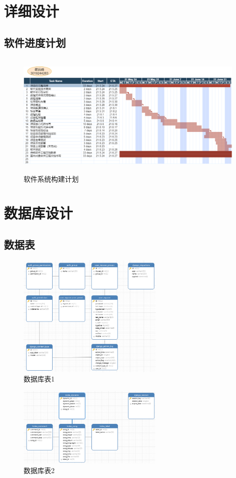 \documentclass[UTF8,14pt]{article}
\numberwithin{figure}{subsubsection}
\numberwithin{table}{subsubsection}
\begin{document}
\section{详细设计}
\subsection{软件进度计划}
\begin{figure}[H]
	\centering
	\includegraphics[width=13.06cm,height=6.12cm]{software.png}
	\caption{软件系统构建计划}
\end{figure}

\clearpage
\section{数据库设计}
\subsection{数据表}
\begin{minipage}[t]{0.58\linewidth}
	\begin{figure}[H]
		\includegraphics[width=7.12cm,height=6.01cm]{ER1.png}
		\caption{数据库表1}
	\end{figure}
\end{minipage}
\begin{minipage}[t]{0.4\linewidth}
	\begin{figure}[H]
		\centering
		\includegraphics[width=7.10cm,height=3.90cm]{ER2.png}
		\caption{数据库表2}
	\end{figure}
\end{minipage}
\end{document}
